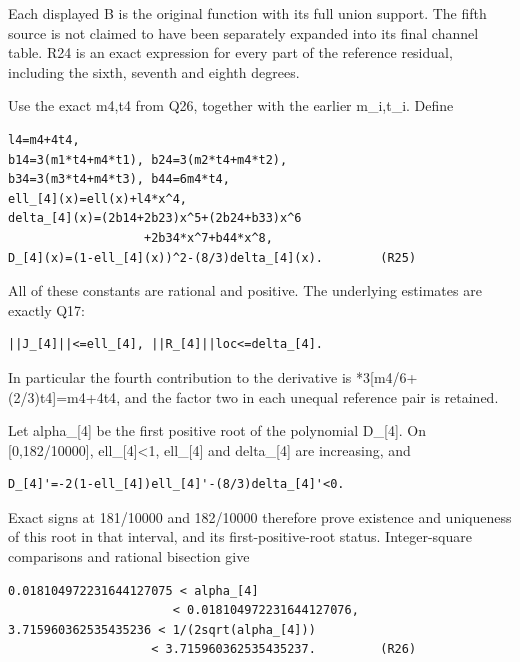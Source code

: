 \documentclass[11pt,a4paper]{article}
\renewcommand{\[}{\begingroup\small\originaldisplaystart}
\renewcommand{\]}{\originaldisplayend\endgroup}
\begin{document}
Each displayed B is the original function with its full union support.
The fifth source is not claimed to have been separately expanded into
its final channel table. R24 is an exact expression for every part of
the reference residual, including the sixth, seventh and eighth degrees.

Use the exact m4,t4 from Q26, together with the earlier m\_i,t\_i.
Define

\begin{verbatim}
l4=m4+4t4,
b14=3(m1*t4+m4*t1), b24=3(m2*t4+m4*t2),
b34=3(m3*t4+m4*t3), b44=6m4*t4,
ell_[4](x)=ell(x)+l4*x^4,
delta_[4](x)=(2b14+2b23)x^5+(2b24+b33)x^6
                   +2b34*x^7+b44*x^8,
D_[4](x)=(1-ell_[4](x))^2-(8/3)delta_[4](x).        (R25)
\end{verbatim}

All of these constants are rational and positive. The underlying
estimates are exactly Q17:

\begin{verbatim}
||J_[4]||<=ell_[4], ||R_[4]||loc<=delta_[4].
\end{verbatim}

In particular the fourth contribution to the derivative is
{\allowbreak{}*\allowbreak{}3\allowbreak{}[\allowbreak{}m\allowbreak{}4\allowbreak{}/\allowbreak{}6\allowbreak{}+\allowbreak{}(\allowbreak{}2\allowbreak{}/\allowbreak{}3\allowbreak{})\allowbreak{}t\allowbreak{}4\allowbreak{}]\allowbreak{}=\allowbreak{}m\allowbreak{}4\allowbreak{}+\allowbreak{}4\allowbreak{}t\allowbreak{}4\allowbreak{}},
and the factor two in each unequal reference pair is retained.

Let alpha\_{[}4{]} be the first positive root of the polynomial
D\_{[}4{]}. On {[}0,182/10000{]}, ell\_{[}4{]}\textless1, ell\_{[}4{]}
and delta\_{[}4{]} are increasing, and

\begin{verbatim}
D_[4]'=-2(1-ell_[4])ell_[4]'-(8/3)delta_[4]'<0.
\end{verbatim}

Exact signs at 181/10000 and 182/10000 therefore prove existence and
uniqueness of this root in that interval, and its first-positive-root
status. Integer-square comparisons and rational bisection give

\begin{verbatim}
0.018104972231644127075 < alpha_[4]
                       < 0.018104972231644127076,
3.715960362535435236 < 1/(2sqrt(alpha_[4]))
                    < 3.715960362535435237.         (R26)
\end{verbatim}
\end{document}
